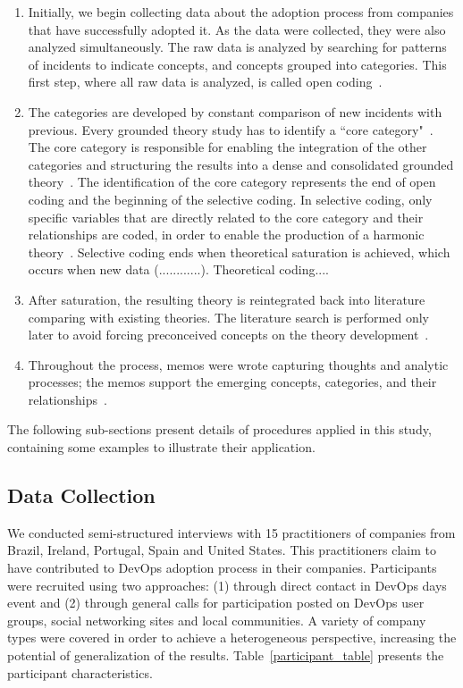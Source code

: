 \begin{enumerate}[label=(\Alph*)]
\item Initially, we begin collecting data about the adoption process from
companies that have successfully adopted it. As the data were collected, they
were also analyzed simultaneously. The raw data is analyzed by searching for
patterns of incidents to indicate concepts, and concepts grouped into
categories. This first step, where all raw data is analyzed, is called open
coding~\cite{stol2016grounded}.

\item The categories are developed by constant comparison of new incidents with
previous. Every grounded theory study has to identify a ``core category"~\cite{stol2016grounded}.
The core category is responsible for enabling the
integration of the other categories and structuring the results into a dense
and consolidated grounded theory~\cite{jantunen2014using}. The identification
of the core category represents the end of open coding and the beginning of the
selective coding. In selective coding, only specific variables that are
directly related to the core category and their relationships are coded, in
order to enable the production of a harmonic theory~\cite{coleman2007using,hoda2011impact}.
Selective coding ends when theoretical saturation is achieved, which occurs when new data (............). Theoretical coding....

\item After saturation, the resulting theory is reintegrated back into
literature comparing with existing theories. The literature search is performed
only later to avoid forcing preconceived concepts on the theory development~\cite{adolph2012reconciling}.

\item Throughout the process, memos were wrote capturing thoughts and analytic
processes; the memos support the emerging concepts, categories, and their
relationships~\cite{adolph2012reconciling}.
\end{enumerate}


The following sub-sections present details of procedures applied in this study,
containing some examples to illustrate their application.

\subsection{Data Collection}
We conducted semi-structured interviews with 15 practitioners of companies from
Brazil, Ireland, Portugal, Spain and United States. This practitioners claim
to have contributed to DevOps adoption process in their companies. Participants
were recruited using two approaches: (1) through direct contact in DevOps days event
and (2) through  general
calls for participation posted on DevOps user groups, social networking sites
and local communities. A variety of company types were covered in order to
achieve a heterogeneous perspective, increasing the potential of generalization
of the results. Table~\ref{participant_table} presents the participant
characteristics.


